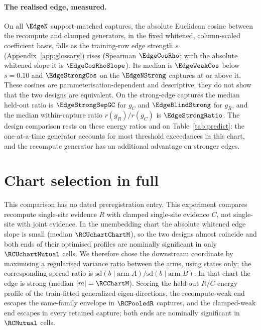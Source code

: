 \paragraph{The realised edge, measured.} On all $\EdgeN$ support-matched captures, the absolute Euclidean cosine between the
recompute and clamped generators, in the fixed whitened, column-scaled coefficient basis, falls as the training-row edge strength
$s$ (Appendix~\ref{app:glossary}) rises (Spearman $\EdgeCosRho$; with the absolute whitened slope it is $\EdgeCosRhoSlope$). Its median is
$\EdgeWeakCos$ below $s=0.10$ and $\EdgeStrongCos$ on the $\EdgeNStrong$ captures at or above it. These cosines are
parameterisation-dependent and descriptive; they do not show that the two designs are equivalent. On the
strong-edge captures the median held-out ratio is $\EdgeStrongSepGC$ for $g_C$ and $\EdgeBlindStrong$ for $g_R$, and
the median within-capture ratio $r(g_R)/r(g_C)$ is $\EdgeStrongRatio$. The design comparison rests on these energy
ratios and on Table~\ref{tab:predict}: the one-at-a-time generator accounts for most threshold exceedances in this
chart, and the recompute generator has an additional advantage on stronger edges.

\section{Chart selection in full}
\label{app:chart}

This comparison has no dated preregistration entry. This experiment compares recompute single-site evidence $R$ with clamped single-site evidence $C$, not single-site
with joint evidence. In the unembedding chart the absolute whitened edge slope is small (median $\RCUchartChartM$), so the
two designs almost coincide and both ends of their optimised profiles are nominally significant in only
$\RCUchartMutual$ cells. We therefore chose the
downstream coordinate by maximising a regularised variance ratio between the arms, using states only; the corresponding
spread ratio is $\mathrm{sd}(b\mid\text{arm }A)/\mathrm{sd}(b\mid\text{arm }B)$. In that chart the edge is strong (median $|m|=\RCChartM$). Scoring the held-out $R/C$ energy profile of the
train-fitted generalized eigen-directions, the recompute-weak end escapes the same-family envelope in $\RCPooledR$
captures, and the clamped-weak end escapes in every retained capture; both ends are nominally significant in
$\RCMutual$ cells.

